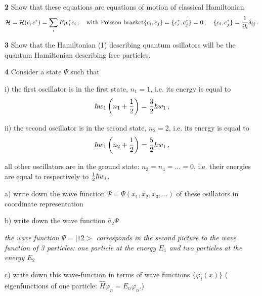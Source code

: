 \m


{\bf 2} Show that these equations are  equations of 
 motion of classical Hamiltonian 
      $$
{\cal H}={\cal H}(c,c^*)=\sum_i E_ic_i^*c_i\,,\quad \hbox {with Poisson bracket}
   \{c_i,c_j\}=
   \{c_i^*,c_j^*\}=0\,,\quad
   \{c_i,c_j^*\}={1\over i\hbar}\delta_{ij}\,.
      $$

\m



{\bf 3}  Show that the Hamiltonian (1)  describing 
quantum osillators will be
the quantum Hamiltonian describing free particles.


\m



{\bf 4}   Consider a state $\Psi$
such that 


i) the first oscillator is in the first state,  $n_1=1$,
i.e. its energy is equal to 
   $$
   \hbar w_1\left(n_1+{1\over 2}\right)=
{3\over 2}\hbar w_1\,,
      $$

ii) the second oscillator is in the second  state,  $n_2=2$,
i.e. its energy is equal to 
   $$
   \hbar w_1\left(n_2+{1\over 2}\right)=
{5\over 2}\hbar w_1\,,
      $$


all other oscillators are in the ground state:
   $n_3=n_4=\dots=0$, i.e. their energies are equal to
     respectively to ${1\over 2}\hbar w_i$.



a) write down the wave function 
 $\Psi=\Psi(x_1,x_2,x_3,\dots)$  of 
these osillators in coordinate representation


b) write down the wave  function $\hat a_2\Psi$


{\it the wave function $\Psi=|12>$  corresponds in the second picture
 to the wave function of
3 particles: one particle  at the energy $E_1$ and two particles 
at the energy $E_2$}


c) write down this wave-function in terms of wave functions
$\{\varphi_i(x)\}$ ( eigenfunctions of one particle: 
  $\hat H\varphi_n=E_n\varphi_n$.)
\bye
